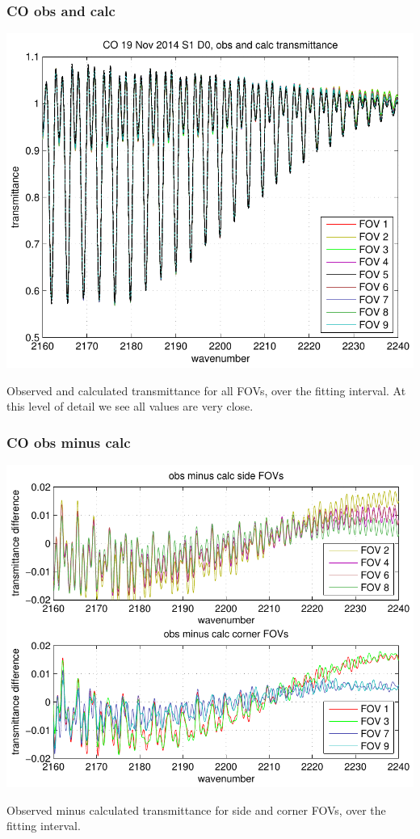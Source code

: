 \documentclass[11pt]{beamer}
\begin{document}
\begin{frame}
\frametitle{CO obs and calc}

\begin{center}
  \includegraphics[scale=0.54]{figures/CO_obs_and_calc.pdf}
\end{center}

Observed and calculated transmittance for all FOVs, over the fitting
interval.  At this level of detail we see all values are very close.

\end{frame}
\begin{frame}
\frametitle{CO obs minus calc}

\begin{center}
  \includegraphics[scale=0.54]{figures/CO_breakout_2.pdf}
\end{center}

Observed minus calculated transmittance for side and corner FOVs,
over the fitting interval.

\end{frame}
\end{document}
